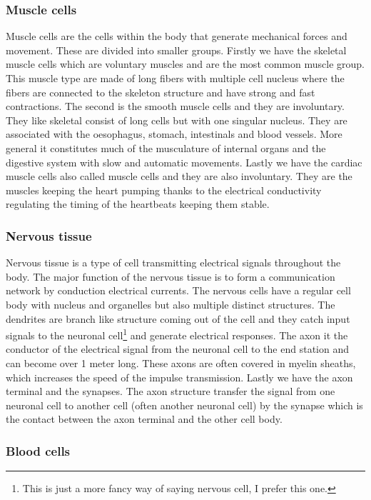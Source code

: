 \documentclass[jmp, amsmath, amssymb, reprint]{article}
\numberwithin{equation}{section}
\begin{document}
\begin{multicols}{2}
\subsubsection{Muscle cells}

Muscle cells are the cells within the body that generate mechanical forces and movement. These are divided into smaller groups. Firstly we have the skeletal muscle cells which are voluntary muscles and are the most common muscle group. This muscle type are made of long fibers with multiple cell nucleus where the fibers are connected to the skeleton structure and have strong and fast contractions. The second is the smooth muscle cells and they are involuntary. They like skeletal consist of long cells but with one singular nucleus. They are associated with the  oesophagus, stomach, intestinals and blood vessels. More general it constitutes much of the musculature of internal organs and the digestive system with slow and automatic movements. Lastly we have the cardiac muscle cells also called muscle cells and they are also involuntary. They are the muscles keeping the heart pumping thanks to the electrical conductivity regulating the timing of the heartbeats keeping them stable.

\subsubsection{Nervous tissue}

Nervous tissue is a type of cell transmitting electrical signals throughout the body. The major function of the nervous tissue is to form a communication network by conduction electrical currents. The nervous cells have a regular cell body with nucleus and organelles but also multiple distinct structures. The dendrites are branch like structure coming out of the cell and they catch input signals to the neuronal cell\footnote{This is just a more fancy way of saying nervous cell, I prefer this one.} and generate electrical responses. The axon it the conductor of the electrical signal from the neuronal cell to the end station and can become over 1 meter long. These axons are often covered in myelin sheaths, which increases the speed of the impulse transmission. Lastly we have the axon terminal and the synapses. The axon structure transfer the signal from one neuronal cell to another cell (often another neuronal cell) by the synapse which is the contact between the axon terminal and the other cell body.

\subsubsection{Blood cells}


\end{multicols}
\end{document}
